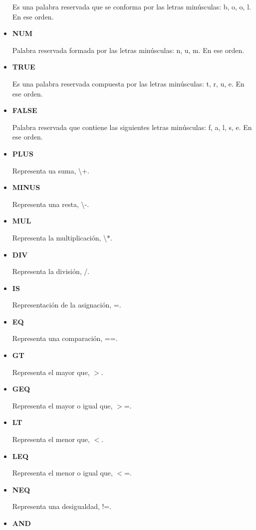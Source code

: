 \documentclass[\main/MemoriaPL.tex]{subfiles}
\begin{document}
\begin{itemize}
        \par
        Es una palabra reservada que se conforma por las letras minúsculas: b, o, o, l. En ese orden.
      \item \textbf{NUM}
        \par
        Palabra reservada formada por las letras minúsculas: n, u, m. En ese orden.
      \item \textbf{TRUE}
        \par
        Es una palabra reservada compuesta por las letras minúsculas: t, r, u, e. En ese orden.
      \item \textbf{FALSE}
        \par
        Palabra reservada que contiene las siguientes letras minúsculas: f, a, l, s, e. En ese orden.
      \item \textbf{PLUS}
        \par
        Representa ua suma, \textbackslash +.
      \item \textbf{MINUS}
        \par
        Representa una resta, \textbackslash -.
      \item \textbf{MUL}
        \par
        Representa la multiplicación, \textbackslash $\ast$.
      \item \textbf{DIV}
        \par
        Representa la división, /.
      \item \textbf{IS}
        \par
        Representación de la asignación, =.
      \item \textbf{EQ}
        \par
        Representa una comparación, ==.
      \item \textbf{GT}
        \par
        Representa el mayor que, $>$.
      \item \textbf{GEQ}
        \par
        Representa el mayor o igual que, $>$=.
      \item \textbf{LT}
        \par
        Representa el menor que, $<$.
      \item \textbf{LEQ}
        \par
        Representa el menor o igual que, $<$=.
      \item \textbf{NEQ}
        \par
        Representa una desigualdad, !=.
      \item \textbf{AND}

\end{itemize}
\end{document}
